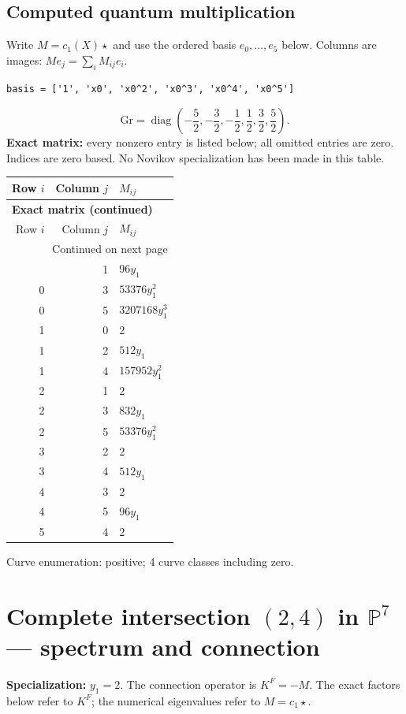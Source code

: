 \documentclass[10pt,a4paper]{article}
\begin{document}
\subsection*{Computed quantum multiplication}
Write $M=c_1(X)\star$ and use the ordered basis $e_0,\ldots,e_{5}$ below. Columns are images: $M e_j=\sum_i M_{ij}e_i$.
\begin{lstlisting}
basis = ['1', 'x0', 'x0^2', 'x0^3', 'x0^4', 'x0^5']
\end{lstlisting}
\[\mathrm{Gr}=\operatorname{diag}\!\left(- \frac{5}{2},- \frac{3}{2},- \frac{1}{2},\frac{1}{2},\frac{3}{2},\frac{5}{2}\right).\]
\textbf{Exact matrix:} every nonzero entry is listed below; all omitted entries are zero. Indices are zero based. No Novikov specialization has been made in this table.
{\small\setlength{\tabcolsep}{7pt}\begin{longtable}{rrp{125mm}}
\toprule Row $i$ & Column $j$ & $M_{ij}$\\\midrule\endfirsthead
\multicolumn{3}{l}{\textbf{Exact matrix (continued)}}\\
\toprule Row $i$ & Column $j$ & $M_{ij}$\\\midrule\endhead
\midrule\multicolumn{3}{r}{Continued on next page}\\\endfoot\bottomrule\endlastfoot
0 & 1 & $96 y_{1}$\\
0 & 3 & $53376 y_{1}^{2}$\\
0 & 5 & $3207168 y_{1}^{3}$\\
1 & 0 & $2$\\
1 & 2 & $512 y_{1}$\\
1 & 4 & $157952 y_{1}^{2}$\\
2 & 1 & $2$\\
2 & 3 & $832 y_{1}$\\
2 & 5 & $53376 y_{1}^{2}$\\
3 & 2 & $2$\\
3 & 4 & $512 y_{1}$\\
4 & 3 & $2$\\
4 & 5 & $96 y_{1}$\\
5 & 4 & $2$\\
\end{longtable}}
Curve enumeration: positive; 4 curve classes including zero.
\clearpage\section*{Complete intersection $(2,4)$ in $\mathbb P^{7}$ --- spectrum and connection}
\textbf{Specialization:} $y_1=2$. The connection operator is $K^F=-M$. The exact factors below refer to $K^F$; the numerical eigenvalues refer to $M=c_1\star$.
\end{document}
